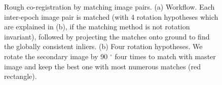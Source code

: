 \begin{figure}[htbp]
    \begin{center}
        \caption{Rough co-registration by matching image pairs. (a) Workflow. Each inter-epoch image pair is matched (with 4 rotation hypotheses which are explained in (b), if the matching method is not rotation invariant), followed by projecting the matches onto ground to find the globally consistent inliers. (b) Four rotation hypotheses. We rotate the secondary image by 90 $^\circ$ four times to match with master image and keep the best one with most numerous matches (red rectangle).}
        \label{WorkflowImgPair}
    \end{center}
\end{figure}

